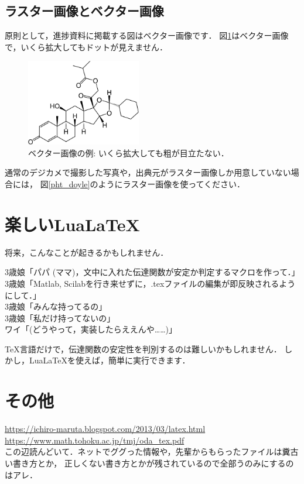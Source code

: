 \documentclass[lualatex,a4paper,ja = standard, twoside, twocolumn]{bxjsarticle}
\begin{document}
  \subsection{ラスター画像とベクター画像}
    原則として，進捗資料に掲載する図はベクター画像です．
    図\ref{fig_ciclesonide}はベクター画像で，いくら拡大してもドットが見えません．
      \begin{figure}[tbp]
        \centering
        \includegraphics[width = 5cm]{figure/chemi_vec.pdf}
        \caption{ベクター画像の例: いくら拡大しても粗が目立たない．} \label{fig_ciclesonide}
      \end{figure}
    通常のデジカメで撮影した写真や，出典元がラスター画像しか用意していない場合には，
    図\ref{pht_doyle}のようにラスター画像を使ってください．
\section{楽しいLua\LaTeX}
  将来，こんなことが起きるかもしれません．
    \begin{screen}
      3歳娘「パパ (ママ)，文中に入れた伝達関数が安定か判定するマクロを作って．」\\
      3歳娘「Matlab, Scilabを行き来せずに，.texファイルの編集が即反映されるようにして．」\\
      3歳娘「みんな持ってるの」\\
      3歳娘「私だけ持ってないの」\\
      ワイ「(どうやって，実装したらええんや……)」
    \end{screen}
  \TeX 言語だけで，伝達関数の安定性を判別するのは難しいかもしれません．
  しかし，Lua\LaTeX を使えば，簡単に実行できます．


\section{その他}
  \url{https://ichiro-maruta.blogspot.com/2013/03/latex.html} \\
  \url{https://www.math.tohoku.ac.jp/tmj/oda_tex.pdf}\\
  この辺読んどいて．ネットでググった情報や，先輩からもらったファイルは糞古い書き方とか，
  正しくない書き方とかが残されているので全部うのみにするのはアレ．
\end{document}

